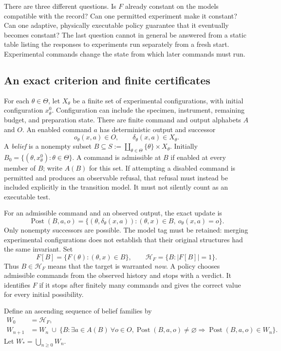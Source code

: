 \documentclass[11pt]{article}
\theoremstyle{definition}
\begin{document}
There are three different questions. Is $F$ already constant on the models
compatible with the record? Can one permitted experiment make it constant?
Can one adaptive, physically executable policy guarantee that it eventually
becomes constant? The last question cannot in general be answered from a
static table listing the responses to experiments run separately from a
fresh start. Experimental commands change the state from which later
commands must run.

\subsection{An exact criterion and finite certificates}

For each $\theta\in\Theta$, let $X_\theta$ be a finite set of experimental
configurations, with initial configuration $x^0_\theta$. Configuration can
include the specimen, instrument, remaining budget, and preparation state.
There are finite command and output alphabets $A$ and $O$. An enabled
command $a$ has deterministic output and successor
\[
 o_\theta(x,a)\in O,\qquad
 \delta_\theta(x,a)\in X_\theta.
\]
A \emph{belief} is a nonempty subset
$B\subseteq S:=\coprod_{\theta\in\Theta}\{\theta\}\times X_\theta$.
Initially $B_0=\{(\theta,x^0_\theta):\theta\in\Theta\}$. A command is
admissible at $B$ if enabled at every member of $B$; write $A(B)$ for this
set. If attempting a disabled command is permitted and produces an
observable refusal, that refusal must instead be included explicitly in
the transition model. It must not silently count as an executable test.

For an admissible command and an observed output, the exact update is
\[
 \operatorname{Post}(B,a,o)=
 \{(\theta,\delta_\theta(x,a)):
        (\theta,x)\in B,\ o_\theta(x,a)=o\}.
\]
Only nonempty successors are possible. The model tag must be retained:
merging experimental configurations does not establish that their original
structures had the same invariant. Set
\[
 F[B]=\{F(\theta):(\theta,x)\in B\},\qquad
 \mathcal H_F=\{B:|F[B]|=1\}.
\]
Thus $B\in\mathcal H_F$ means that the target is warranted \emph{now}.
A policy chooses admissible commands from the observed history and stops
with a verdict. It identifies $F$ if it stops after finitely many commands
and gives the correct value for every initial possibility.

Define an ascending sequence of belief families by
\begin{align*}
 W_0&=\mathcal H_F,\\
 W_{n+1}&=W_n\ \cup\
 \{B:\exists a\in A(B)\ \forall o\in O,
     \operatorname{Post}(B,a,o)\ne\varnothing
     \Rightarrow\operatorname{Post}(B,a,o)\in W_n\}.
\end{align*}
Let $W_*=\bigcup_{n\ge0}W_n$.
\end{document}
